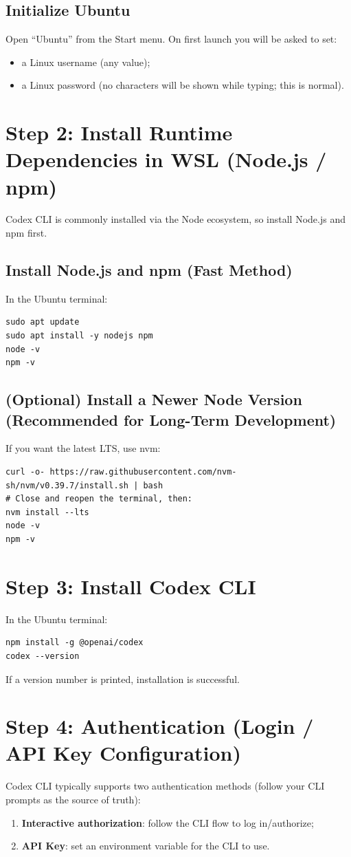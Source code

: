 \documentclass[11pt,a4paper]{article}
\begin{document}
\subsection{Initialize Ubuntu}
Open ``Ubuntu'' from the Start menu. On first launch you will be asked to set:
\begin{itemize}[leftmargin=1.5em]
  \item a Linux username (any value);
  \item a Linux password (no characters will be shown while typing; this is normal).
\end{itemize}

\section{Step 2: Install Runtime Dependencies in WSL (Node.js / npm)}
Codex CLI is commonly installed via the Node ecosystem, so install Node.js and npm first.

\subsection{Install Node.js and npm (Fast Method)}
In the Ubuntu terminal:
\begin{lstlisting}
sudo apt update
sudo apt install -y nodejs npm
node -v
npm -v
\end{lstlisting}

\subsection{(Optional) Install a Newer Node Version (Recommended for Long-Term Development)}
If you want the latest LTS, use nvm:
\begin{lstlisting}
curl -o- https://raw.githubusercontent.com/nvm-sh/nvm/v0.39.7/install.sh | bash
# Close and reopen the terminal, then:
nvm install --lts
node -v
npm -v
\end{lstlisting}

\section{Step 3: Install Codex CLI}
In the Ubuntu terminal:
\begin{lstlisting}
npm install -g @openai/codex
codex --version
\end{lstlisting}
If a version number is printed, installation is successful.

\section{Step 4: Authentication (Login / API Key Configuration)}
Codex CLI typically supports two authentication methods (follow your CLI prompts as the source of truth):
\begin{enumerate}[leftmargin=1.7em]
  \item \textbf{Interactive authorization}: follow the CLI flow to log in/authorize;
  \item \textbf{API Key}: set an environment variable for the CLI to use.
\end{enumerate}
\end{document}
